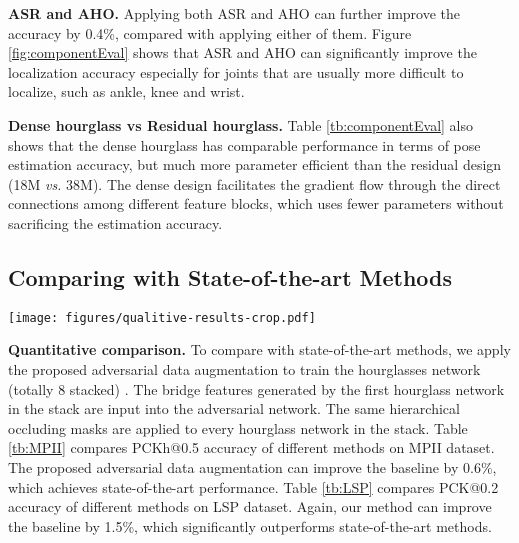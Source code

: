 \documentclass[10pt,twocolumn,letterpaper]{article}
\begin{document}
{\bf ASR and AHO.} Applying both ASR and AHO can further improve the accuracy by 0.4\%, compared with applying either of them. Figure \ref{fig:componentEval} shows that ASR and AHO can significantly improve the localization accuracy especially for joints that are usually more difficult to localize, such as ankle, knee and wrist. 

{\bf Dense hourglass vs Residual hourglass.} Table \ref{tb:componentEval} also shows that the dense hourglass has comparable performance in terms of pose estimation accuracy, but much more parameter efficient than the residual design (18M {\it vs.} 38M). The dense design facilitates the gradient flow through the direct connections among different feature blocks, which uses fewer parameters without sacrificing the estimation accuracy.  

\subsection{Comparing with State-of-the-art Methods}\begin{figure*}[hbt]
\centering
  \texttt{[image: figures/qualitive-results-crop.pdf]}
\caption{Comparisons of the same Stacked HG network trained using random data augmentation ({\bf top}) and adversarial data augmentation ({\bf bottom}). Note the improvement on challenging joints ({\it e.g.} ankle, elbow, wrist), and left-right confusion.}
\label{fig:qualitatve}
\end{figure*}{\bf Quantitative comparison.}%
To compare with state-of-the-art methods, we apply the proposed adversarial data augmentation to train the hourglasses network (totally 8 stacked) \cite{newell2016stacked}. 
The bridge features generated by the first hourglass network in the stack are input into the adversarial network.
The same hierarchical occluding masks are applied to every hourglass network in the stack.
Table \ref{tb:MPII} compares PCKh@0.5 accuracy of different methods on MPII dataset.
The proposed adversarial data augmentation can improve the baseline \cite{newell2016stacked} by 0.6\%, which achieves state-of-the-art performance. 
Table \ref{tb:LSP} compares PCK@0.2 accuracy of different methods on LSP dataset. Again, our method can improve the baseline \cite{newell2016stacked} by 1.5\%, which significantly outperforms state-of-the-art methods.
\end{document}
